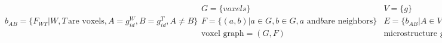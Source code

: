 \begin{subequations}

\begin{equation}
b_{AB}=\{F_{WT} | W, T\, \text{are voxels}, A = g^W_{id}, B = g^T_{id}, A \neq B\}
\label{eq:gbdef}
\end{equation}

\begin{equation}
\begin{aligned}
G=\{voxels\} \\
F=\{(a, b) | a \in G, b \in G, a \text{ and} b \text{are neighbors}\} \\
\text{voxel graph} = (G, F)
\end{aligned}
\label{eq:voxelgraph}
\end{equation}

\begin{equation}
\begin{aligned}
V=\{g\} \\
E=\{b_{AB} | A \in V, B \in V\} \\
\text{microstructure graph} = (V, E)
\end{aligned}
\label{eq:micrograph}
\end{equation}

\end{subequations}